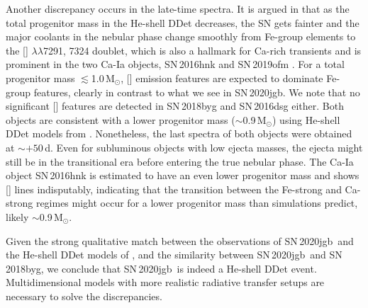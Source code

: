 \documentclass[twocolumn]{aastex631}
\newcommand{\sn}{SN\,2020jgb}
\begin{document}
\begin{CJK*}{UTF8}{gbsn}
Another discrepancy occurs in the late-time spectra. It is argued in \citet{polin_nebular_2021} that as the total progenitor mass in the He-shell DDet decreases, the SN gets fainter and the major coolants in the nebular phase change smoothly from Fe-group elements to the [] $\lambda\lambda$7291, 7324 doublet, which is also a hallmark for Ca-rich transients and is prominent in the two Ca-Ia objects, SN\,2016hnk and SN\,2019ofm \citep{galbany_16hnk_2019,De_Ca-rich_2020}. For a total progenitor mass $\lesssim$1.0\,$\mathrm{M_\odot}$, [] emission features are expected to dominate Fe-group features, clearly in contrast to what we see in \sn. We note that no significant [] features are detected in SN\,2018byg and SN\,2016dsg either. Both objects are consistent with a lower progenitor mass ($\sim$0.9\,$\mathrm{M_\odot}$) using He-shell DDet models from \citet{polin_observational_2019}. Nonetheless, the last spectra of both objects were obtained at $\sim$$+50$\,d. Even for subluminous objects with low ejecta masses, the ejecta might still be in the transitional era before entering the true nebular phase. The Ca-Ia object SN\,2016hnk is estimated to have an even lower progenitor mass \citep[$\sim$0.87\,$\mathrm{M_\odot}$;][]{jacobson-galan_16hnk_2020} and shows [] lines indisputably, indicating that the transition between the Fe-strong and Ca-strong regimes might occur for a lower progenitor mass than simulations predict, likely $\sim$0.9\,$\mathrm{M_\odot}$. 

Given the strong qualitative match between the observations of \sn\ and the He-shell DDet models of \citet{polin_observational_2019}, and the similarity between \sn\ and SN\,2018byg, we conclude that \sn\ is indeed a He-shell DDet event. Multidimensional models with more realistic radiative transfer setups are necessary to solve the discrepancies.


\end{CJK*}
\end{document}
